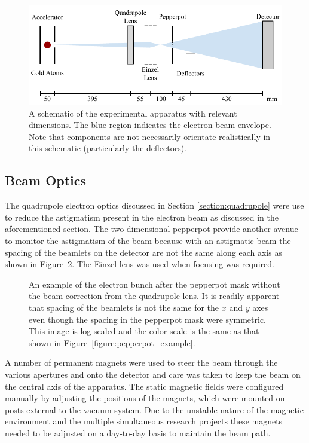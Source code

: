 \begin{figure}
\center
\includegraphics{part2/Figs/EmittanceApparatusSchematic.pdf}
\caption[Brightness measurement apparatus with dimensions.]{A schematic of the experimental apparatus with relevant dimensions. The blue region indicates the electron beam envelope. Note that components are not necessarily orientate realistically in this schematic (particularly the deflectors).}
\label{figure:emittance_schematic}
\end{figure}

\subsection{Beam Optics}
The quadrupole electron optics discussed in Section \ref{section:quadrupole} were use to reduce the astigmatism present in the electron beam as discussed in the aforementioned section.
The two-dimensional pepperpot provide another avenue to monitor the astigmatism of the beam because with an astigmatic beam the spacing of the beamlets on the detector are not the same along each axis as shown in Figure~\ref{figure:astigmatic_pepperpot}.
The Einzel lens was used when focusing was required.

\begin{figure}
    \center
    
    \caption[Pepperpot measurements with and without beam astigmatism correction.]{An example of the electron bunch after the pepperpot mask without the beam correction from the quadrupole lens. It is readily apparent that spacing of the beamlets is not the same for the $x$ and $y$ axes even though the spacing in the pepperpot mask were symmetric. This image is log scaled and the color scale is the same as that shown in Figure~\ref{figure:pepperpot_example}.}
    \label{figure:astigmatic_pepperpot}
\end{figure}

A number of permanent magnets were used to steer the beam through the various apertures and onto the detector and care was taken to keep the beam on the central axis of the apparatus.
The static magnetic fields were configured manually by adjusting the positions of the magnets, which were mounted on posts external to the vacuum system.
Due to the unstable nature of the magnetic environment and the multiple simultaneous research projects these magnets needed to be adjusted on a day-to-day basis to maintain the beam path.

